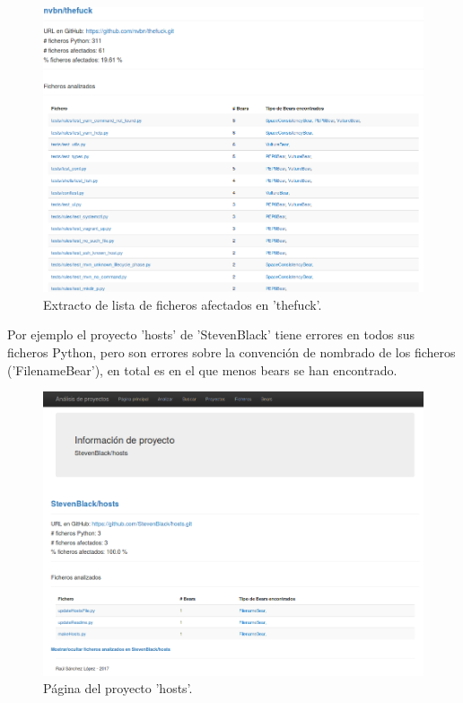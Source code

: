 \documentclass[a4paper, 12pt]{book}
\begin{document}
\begin{figure}[H]
  \centering
  \includegraphics[width=15cm, keepaspectratio]{img/theFuckInfo}
  \caption{Extracto de lista de ficheros afectados en 'thefuck'.}
  \label{fig:theFuckInfo}
\end{figure}

Por ejemplo el proyecto 'hosts' de 'StevenBlack' tiene errores en todos sus ficheros Python, pero son errores sobre la convención de nombrado de los ficheros ('FilenameBear'), en total es en el que menos bears se han encontrado.
\begin{figure}[H]
  \centering
  \includegraphics[width=15cm, keepaspectratio]{img/proyectoHosts}
  \caption{Página del proyecto 'hosts'.}
  \label{fig:proyectoHosts}
\end{figure}
\end{document}
